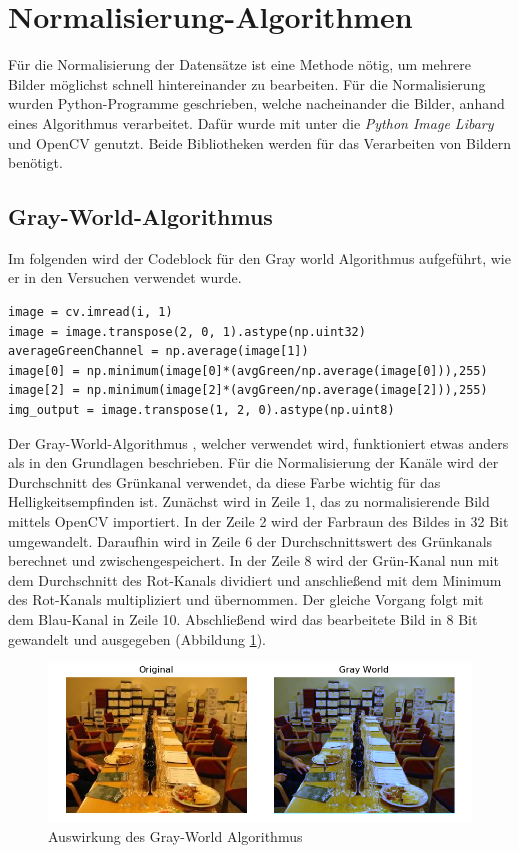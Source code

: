 \section{Normalisierung-Algorithmen}\label{s.nalgorithmen}
Für die Normalisierung der Datensätze ist eine Methode nötig, um mehrere Bilder möglichst schnell hintereinander zu bearbeiten. Für die Normalisierung wurden Python-Programme geschrieben, welche nacheinander die Bilder, anhand eines Algorithmus verarbeitet. Dafür wurde mit unter die \textit{Python Image Libary} und OpenCV genutzt. Beide Bibliotheken werden für das Verarbeiten von Bildern benötigt. 
\newpage
\subsection{Gray-World-Algorithmus} 
Im folgenden wird der Codeblock für den Gray world Algorithmus aufgeführt, wie er in den Versuchen verwendet wurde.\\
\begin{lstlisting}
image = cv.imread(i, 1)
image = image.transpose(2, 0, 1).astype(np.uint32)
averageGreenChannel = np.average(image[1])
image[0] = np.minimum(image[0]*(avgGreen/np.average(image[0])),255)
image[2] = np.minimum(image[2]*(avgGreen/np.average(image[2])),255)
img_output = image.transpose(1, 2, 0).astype(np.uint8)
\end{lstlisting}
Der Gray-World-Algorithmus \cite{gray2012world}, welcher verwendet wird, funktioniert etwas anders als in den Grundlagen beschrieben. Für die Normalisierung der Kanäle wird der Durchschnitt des Grünkanal verwendet, da diese Farbe wichtig für das Helligkeitsempfinden ist. Zunächst wird in Zeile 1, das zu normalisierende Bild mittels OpenCV importiert. In der Zeile 2 wird der Farbraun des Bildes in 32 Bit umgewandelt. Daraufhin wird in Zeile 6 der Durchschnittswert des Grünkanals berechnet und zwischengespeichert. In der Zeile 8 wird der Grün-Kanal nun mit dem Durchschnitt des Rot-Kanals dividiert und anschließend mit dem Minimum des Rot-Kanals multipliziert und übernommen. Der gleiche Vorgang folgt mit dem Blau-Kanal in Zeile 10. Abschließend wird das bearbeitete Bild in 8 Bit gewandelt und ausgegeben (Abbildung \ref{img:gwnimg}). 
\begin{figure}
	[h]
	\centering
	\includegraphics[scale=0.6]{Sources/gwn.png}
	\caption{Auswirkung des Gray-World Algorithmus}
	\label{img:gwnimg}
\end{figure}
\newpage
